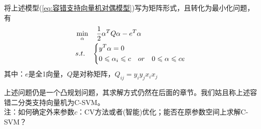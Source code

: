 	\par
	将上述模型(\ref{eq:容错支持向量机对偶模型})写为矩阵形式，且转化为最小化问题，有
	\begin{align}\label{eq:容错支持向量机对偶模型矩阵形式}
	& \min_{\alpha} \quad \frac{1}{2}\alpha^T Q \alpha - e^T \alpha \\
	& s.t. \quad \left\{
		\begin{aligned}
		& y^T \alpha = 0 \notag\\
		& 0 \leqslant \alpha_i \leqslant c \quad or \quad 0 \leqslant \alpha \leqslant ce \notag\\
		\end{aligned}
	\right.
	\end{align}
	\noindent
	其中：$e$是全1向量，$Q$是对称矩阵，$Q_{ij}=y_iy_jx_ix_j$
	\par
	上述问题仍是一个凸规划问题，其求解方式仍然在后面的章节。我们姑且称上述容错二分类支持向量机为C-SVM。\\
	注：如何确定外来参数$c$：CV方法或者(智能)优化；能否在原参数空间上求解C-SVM？

